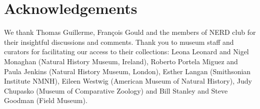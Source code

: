 \documentclass[12pt,a4paper]{article}
\begin{document}
\section{Acknowledgements}
	We thank Thomas Guillerme, Fran\c{c}ois Gould and the members of NERD club for their insightful discussions and comments. Thank you to museum staff and curators for facilitating our access to their collections: Leona Leonard and Nigel Monaghan (Natural History Museum, Ireland), Roberto Portela Miguez and Paula Jenkins (Natural History Museum, London), Esther Langan (Smithsonian Institute NMNH), Eileen Westwig (American Museum of Natural History), Judy Chupasko (Museum of Comparative Zoology) and Bill Stanley and Steve Goodman (Field Museum).


% 
 


 
\end{document}
